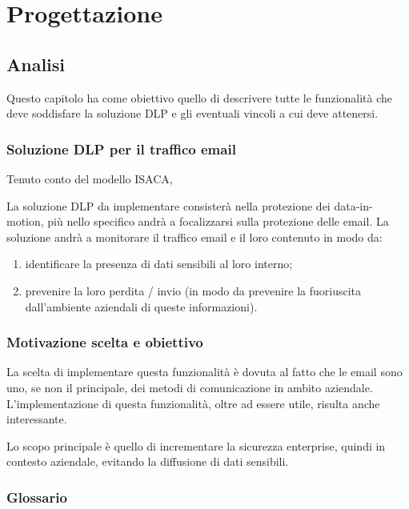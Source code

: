 \chapter{Progettazione}

\section{Analisi}
  Questo capitolo ha come obiettivo quello di descrivere tutte le funzionalità che deve soddisfare la 
  soluzione DLP e gli eventuali vincoli a cui deve attenersi.

  \subsection{Soluzione DLP per il traffico email}
  Tenuto conto del modello ISACA,

  La soluzione DLP da implementare consisterà nella protezione dei data-in-motion, più nello specifico
  andrà a focalizzarsi sulla protezione delle email. La soluzione andrà a monitorare il traffico email e
  il loro contenuto in modo da:

  \begin{enumerate}
      \item {identificare la presenza di dati sensibili al loro interno;}
      \item {prevenire la loro perdita / 
      invio (in modo da prevenire la fuoriuscita dall’ambiente aziendali di queste informazioni).}
  \end{enumerate}

  \subsection{Motivazione scelta e obiettivo}
  La scelta di implementare questa funzionalità è dovuta al fatto che le email sono uno, 
  se non il principale, dei metodi di comunicazione in ambito aziendale.
  L’implementazione di questa funzionalità, oltre ad essere utile, risulta anche interessante.

  Lo scopo principale è quello di incrementare la sicurezza enterprise, quindi in contesto aziendale, 
  evitando la diffusione di dati sensibili.

  \pagebreak
  \subsection{Glossario}

